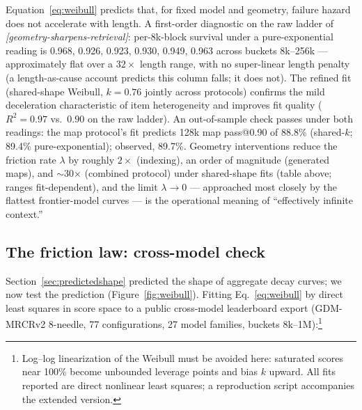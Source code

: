 \documentclass[11pt]{article}
\theoremstyle{remark}
\newif\ifslugs \slugstrue  %
\newcommand{\slug}[1]{\ifslugs\,{\small\textit{[#1]}}\fi}
\begin{document}
Equation~\eqref{eq:weibull} predicts that, for fixed model and geometry, failure
hazard does not accelerate with length. A first-order diagnostic on the raw ladder of \citet{franz2026lens}\slug{geometry-sharpens-retrieval}:
per-8k-block survival under a pure-exponential reading is 0.968, 0.926, 0.923,
0.930, 0.949, 0.963 across buckets 8k--256k --- approximately flat over a $32\times$ length
range, with no super-linear length penalty (a length-as-cause account predicts
this column falls; it does not). The refined fit (shared-shape Weibull,
$k = 0.76$ jointly across protocols) confirms the mild deceleration
characteristic of item heterogeneity and improves fit quality
($R^2 = 0.97$ vs.\ $0.90$ on the raw ladder). An out-of-sample check passes
under both readings: the map protocol's fit predicts 128k map pass@0.90 of
88.8\% (shared-$k$; 89.4\% pure-exponential); observed, 89.7\%. Geometry
interventions reduce the friction rate $\lambda$ by roughly $2\times$
(indexing), an order of magnitude (generated maps), and $\sim$30$\times$
(combined protocol) under shared-shape fits (table above; ranges fit-dependent),
and the limit $\lambda \to 0$ --- approached most closely by
the flattest frontier-model curves --- is the operational meaning of
``effectively infinite context.''

\subsection{The friction law: cross-model check}

Section~\ref{sec:predictedshape} predicted the shape of aggregate decay curves;
we now test the prediction (Figure~\ref{fig:weibull}). Fitting Eq.~\eqref{eq:weibull} by direct least
squares in score space to a public cross-model leaderboard export (GDM-MRCRv2
8-needle, 77 configurations, 27 model families, buckets
8k--1M):\footnote{Log--log linearization of the Weibull must be avoided here:
saturated scores near 100\% become unbounded leverage points and bias $k$
upward. All fits reported are direct nonlinear least squares; a reproduction
script accompanies the extended version.}
\end{document}
